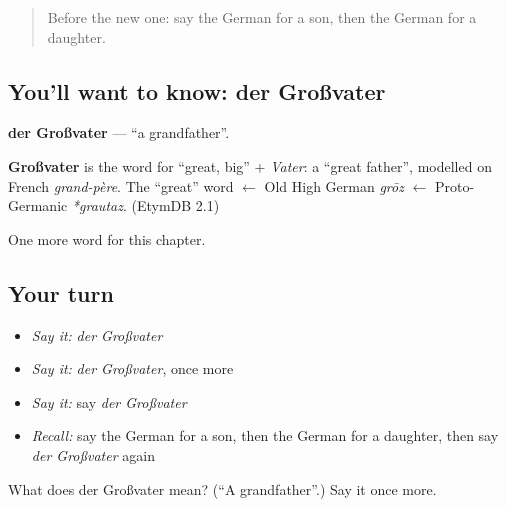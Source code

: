 \begin{quote}
Before the new one: say the German for a son, then the German for a daughter.
\end{quote}

\subsection*{You'll want to know: der Großvater}
\textbf{der Großvater} — \textquotedblleft{}a grandfather\textquotedblright{}.

\begin{cousinweb}
\textbf{Großvater} is the word for \textquotedblleft{}great, big\textquotedblright{} + \emph{Vater}: a \textquotedblleft{}great father\textquotedblright{}, modelled on French \emph{grand-père}. The \textquotedblleft{}great\textquotedblright{} word $\leftarrow$ Old High German \emph{grōz} $\leftarrow$ Proto-Germanic \emph{*grautaz}. (EtymDB 2.1)
\end{cousinweb}

\begin{grammarlens}[title={What you've built}]
One more word for this chapter.
\end{grammarlens}

\subsection*{Your turn}
\begin{itemize}
\raggedright
  \item \emph{Say it:} \emph{der Großvater}
  \item \emph{Say it:} \emph{der Großvater}, once more
  \item \emph{Say it:} say \emph{der Großvater}
  \item \emph{Recall:} say the German for a son, then the German for a daughter, then say \emph{der Großvater} again
\end{itemize}

\begin{tcolorbox}[breakable,colback=teal!4,colframe=teal!35!black,title={Before you move on}]
What does der Großvater mean? (\textquotedblleft{}A grandfather\textquotedblright{}.) Say it once more.
\end{tcolorbox}

